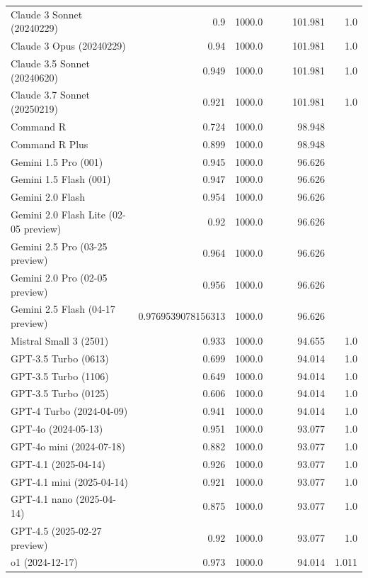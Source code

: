 \begin{table}[htp]
{\begin{tabular}{lrrrrrr}
Claude 3 Sonnet (20240229) & 0.9 & 1000.0 &  &  & 101.981 & 1.0 \\
Claude 3 Opus (20240229) & 0.94 & 1000.0 &  &  & 101.981 & 1.0 \\
Claude 3.5 Sonnet (20240620) & 0.949 & 1000.0 &  &  & 101.981 & 1.0 \\
Claude 3.7 Sonnet (20250219) & 0.921 & 1000.0 &  &  & 101.981 & 1.0 \\
Command R & 0.724 & 1000.0 &  &  & 98.948 &  \\
Command R Plus & 0.899 & 1000.0 &  &  & 98.948 &  \\
Gemini 1.5 Pro (001) & 0.945 & 1000.0 &  &  & 96.626 &  \\
Gemini 1.5 Flash (001) & 0.947 & 1000.0 &  &  & 96.626 &  \\
Gemini 2.0 Flash & 0.954 & 1000.0 &  &  & 96.626 &  \\
Gemini 2.0 Flash Lite (02-05 preview) & 0.92 & 1000.0 &  &  & 96.626 &  \\
Gemini 2.5 Pro (03-25 preview) & 0.964 & 1000.0 &  &  & 96.626 &  \\
Gemini 2.0 Pro (02-05 preview) & 0.956 & 1000.0 &  &  & 96.626 &  \\
Gemini 2.5 Flash (04-17 preview) & 0.9769539078156313 & 1000.0 &  &  & 96.626 &  \\
Mistral Small 3 (2501) & 0.933 & 1000.0 &  &  & 94.655 & 1.0 \\
GPT-3.5 Turbo (0613) & 0.699 & 1000.0 &  &  & 94.014 & 1.0 \\
GPT-3.5 Turbo (1106) & 0.649 & 1000.0 &  &  & 94.014 & 1.0 \\
GPT-3.5 Turbo (0125) & 0.606 & 1000.0 &  &  & 94.014 & 1.0 \\
GPT-4 Turbo (2024-04-09) & 0.941 & 1000.0 &  &  & 94.014 & 1.0 \\
GPT-4o (2024-05-13) & 0.951 & 1000.0 &  &  & 93.077 & 1.0 \\
GPT-4o mini (2024-07-18) & 0.882 & 1000.0 &  &  & 93.077 & 1.0 \\
GPT-4.1 (2025-04-14) & 0.926 & 1000.0 &  &  & 93.077 & 1.0 \\
GPT-4.1 mini (2025-04-14) & 0.921 & 1000.0 &  &  & 93.077 & 1.0 \\
GPT-4.1 nano (2025-04-14) & 0.875 & 1000.0 &  &  & 93.077 & 1.0 \\
GPT-4.5 (2025-02-27 preview) & 0.92 & 1000.0 &  &  & 93.077 & 1.0 \\
o1 (2024-12-17) & 0.973 & 1000.0 &  &  & 94.014 & 1.011 \\

\end{tabular}}
\end{table}
